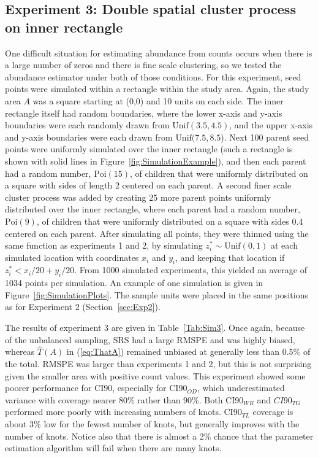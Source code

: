 \documentclass[12pt, titlepage]{article}\usepackage[]{graphicx}\usepackage[]{color}
\def\Poi{\textrm{Poi}}
\def\Unif{\textrm{Unif}}
\begin{document}

\subsection{Experiment 3: Double spatial cluster process on inner rectangle} \label{sec:Exp3}

One difficult situation for estimating abundance from counts occurs when there is a large number of zeros and there is fine scale clustering, so we tested the abundance estimator under both of those conditions. For this experiment, seed points were simulated within a rectangle within the study area. Again, the study area $A$ was a square starting at (0,0) and 10 units on each side.  The inner rectangle itself had random boundaries, where the lower x-axis and y-axis boundaries were each randomly drawn from $\Unif(3.5,4.5)$, and the upper x-axis and y-axis boundaries were each drawn from $\Unif(7.5,8.5$). Next 100 parent seed points were uniformly simulated over the inner rectangle (such a rectangle is shown with solid lines in Figure~\ref{fig:SimulationExample}), and then each parent had a random number, $\Poi(15)$, of children that were uniformly distributed on a square with sides of length 2 centered on each parent.  A second finer scale cluster process was added by creating 25 more parent points uniformly distributed over the inner rectangle, where each parent had a random number, $\Poi(9)$, of children that were uniformly distributed on a square with sides 0.4 centered on each parent.  After simulating all points, they were thinned using the same function as experiments 1 and 2, by simulating $z^*_i \sim \Unif(0,1)$ at each simulated location with coordinates $x_i$ and $y_i$, and keeping that location if $z^*_i < x_i/20 + y_i/20$. From 1000 simulated experiments, this yielded an average of 1034 points per simulation.  An example of one simulation is given in Figure~\ref{fig:SimulationPlots}.  The sample units were placed in the same positions as for Experiment 2 (Section~\ref{sec:Exp2}).

The results of experiment 3 are given in Table~\ref{Tab:Sim3}. Once again, because of the unbalanced sampling, SRS had a large RMSPE and was highly biased, whereas $\widehat{T}(A)$ in (\ref{eq:ThatA}) remained unbiased at generally less than 0.5\% of the total. RMSPE was larger than experiments 1 and 2, but this is not surprising given the smaller area with positive count values.  This experiment showed some poorer performance for CI90, especially for  CI90$_{OD}$, which underestimated variance with coverage nearer 80\% rather than 90\%. Both CI90$_{WR}$ and $CI90_{TG}$ performed more poorly with increasing numbers of knots. CI90$_{TL}$ coverage is about 3\% low for the fewest number of knots, but generally improves with the number of knots. Notice also that there is almost a 2\% chance that the parameter estimation algorithm will fail when there are many knots.
\end{document}
